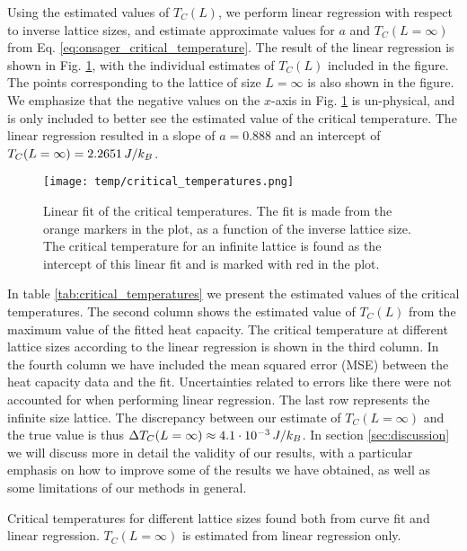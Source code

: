 Using the estimated values of $T_C(L)$, we perform linear regression with respect to inverse lattice sizes, and estimate approximate values for $a$ and $T_C(L=\infty)$ from Eq. \eqref{eq:onsager_critical_temperature}. The result of the linear regression is shown in Fig. \ref{fig:critical_temperatures}, with the individual estimates of $T_C(L)$ included in the figure. The points corresponding to the lattice of size $L=\infty$ is also shown in the figure. We emphasize that the negative values on the $x$-axis in Fig. \ref{fig:critical_temperatures} is un-physical, and is only included to better see the estimated value of the critical temperature. The linear regression resulted in a slope of $a=0.888$ and an intercept of $T_C(L=\infty)=2.2651\,J/k_B$.     
\begin{figure}[!ht]
    \texttt{[image: temp/critical\_temperatures.png]} 
    \caption{Linear fit of the critical temperatures. The fit is made from the orange markers in the plot, as a function of the inverse lattice size. The critical temperature for an infinite lattice is found as the intercept of this linear fit and is marked with red in the plot. }
    \label{fig:critical_temperatures}
\end{figure} 

In table \ref{tab:critical_temperatures} we present the estimated values of the critical temperatures. The second column shows the estimated value of $T_C(L)$ from the maximum value of the fitted heat capacity. The critical temperature at different lattice sizes according to the linear regression is shown in the third column. In the fourth column we have included the mean squared error (MSE) between the heat capacity data and the fit. Uncertainties related to errors like there were not accounted for when performing linear regression. The last row represents the infinite size lattice. The discrepancy between our estimate of $T_C(L=\infty)$ and the true value is thus $\Delta T_C(L=\infty)\approx4.1\cdot10^{-3}\,J/k_B$. In section \ref{sec:discussion} we will discuss more in detail the validity of our results, with a particular emphasis on how to improve some of the results we have obtained, as well as some limitations of our methods in general.    
\begin{table}[!ht]
    
    \caption{Critical temperatures for different lattice sizes found both from curve fit and linear regression. $T_C(L=\infty)$ is estimated from linear regression only.}
    \label{tab:critical_temperatures}
\end{table}

